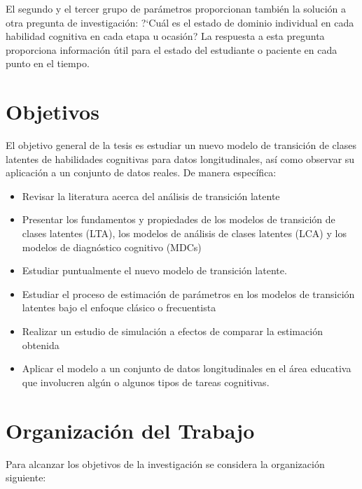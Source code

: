 		El segundo y el tercer grupo de par\'{a}metros proporcionan tambi\'{e}n la soluci\'{o}n a otra pregunta de investigaci\'{o}n: ?`Cu\'{a}l es el estado de dominio individual en cada habilidad cognitiva en cada etapa u ocasi\'{o}n? La respuesta a esta pregunta proporciona informaci\'{o}n \'{u}til para el estado del estudiante o paciente en cada punto en el tiempo.
		
		\section{Objetivos} \label{sec:objetivo}
		
		El objetivo general de la tesis es estudiar un nuevo modelo de transici\'{o}n de clases latentes de habilidades cognitivas para datos longitudinales, as\'{i} como observar su aplicaci\'{o}n a un conjunto de datos reales. De manera espec\'{i}fica:
		
		\begin{itemize}
			\item Revisar la literatura acerca del an\'{a}lisis de transici\'{o}n latente 
			\item Presentar los fundamentos y propiedades de los modelos de transici\'{o}n de clases latentes (LTA), los modelos de an\'{a}lisis de clases latentes (LCA) y los modelos de diagn\'{o}stico cognitivo (MDCs)
			\item Estudiar puntualmente el nuevo modelo de transici\'{o}n latente.
			\item Estudiar el proceso de estimaci\'{o}n de par\'{a}metros en los modelos de transici\'{o}n latentes bajo el enfoque cl\'{a}sico o frecuentista
			\item Realizar un estudio de simulaci\'{o}n a efectos de comparar la estimaci\'{o}n obtenida
			\item Aplicar el modelo a un conjunto de datos longitudinales  en el \'{a}rea educativa que involucren alg\'{u}n o algunos tipos de tareas cognitivas.
		\end{itemize}
		
		
		\section{Organizaci\'{o}n del Trabajo} \label{sec:organizacion}
		
		Para alcanzar los objetivos de la investigaci\'{o}n se considera la organizaci\'{o}n siguiente:
		
